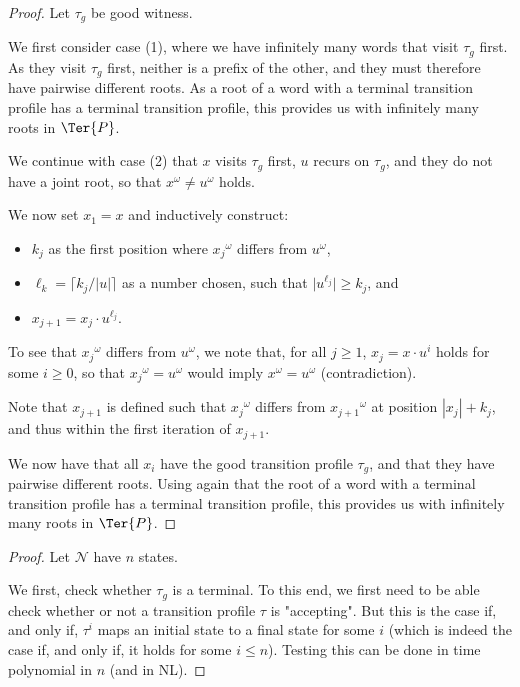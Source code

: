 \documentclass[a4paper,USenglish,cleveref,autoref,thm-restate]{lipics-v2021}
\newcommand{\mc}[1]{\ensuremath{\mathcal{#1}}}
\newcommand{\N}{\mc{N}}
\begin{document}
{\begin{proof}
    Let $\tau_g$ be good witness.


    We first consider case (1), where we have infinitely many words that visit $\tau_g$ first.
    As they visit $\tau_g$ first, neither is a prefix of the other, and they must therefore have pairwise different roots.
    As a root of a word with a terminal transition profile has a terminal transition profile, this provides us with infinitely many roots in $\Ter{P}$.

    We continue with case (2) that $x$ visits $\tau_g$ first, $u$ recurs on $\tau_g$, and they do not have a joint root, so that $x^\omega \neq u^\omega$ holds.

    We now set $x_1=x$ and inductively construct:
    \begin{itemize}
        \item $k_j$ as the first position where ${x_j}^\omega$ differs from $u^\omega$,
        \item $\ell_k = \big\lceil k_j/|u| \big\rceil$ as a number chosen, such that $\big|u^{\ell_j}\big| \geq k_j$, and
        \item $x_{j+1} = x_j\cdot u^{\ell_j}$.
    \end{itemize}
    To see that ${x_j}^\omega$ differs from $u^\omega$, we note that, for all $j\geq 1$, $x_j = x \cdot u^i$ holds for some $i\geq 0$, so that ${x_j}^\omega=u^\omega$ would imply $x^\omega = u^\omega$ (contradiction).

    Note that $x_{j+1}$ is defined such that ${x_j}^\omega$ differs from ${x_{j+1}}^\omega$ at position $|x_j|+k_j$, and thus within the first iteration of $x_{j+1}$.

    We now have that all $x_i$ have the good transition profile $\tau_g$, and that they have pairwise different roots.
    Using again that the root of a word with a terminal transition profile has a terminal transition profile, this provides us with infinitely many roots in $\Ter{P}$.
\end{proof}

\rstIsItGood*

\begin{proof}
    Let $\N$ have $n$ states.

    We first, check whether $\tau_g$ is a terminal.
    To this end, we first need to be able check whether or not a transition profile $\tau$ is "accepting". But this is the case if, and only if, $\tau^i$ maps an initial state to a final state for some $i$ (which is indeed the case if, and only if, it holds for some $i \leq n$). Testing this can be done in time polynomial in $n$ (and in NL).


\end{proof}}
\end{document}
